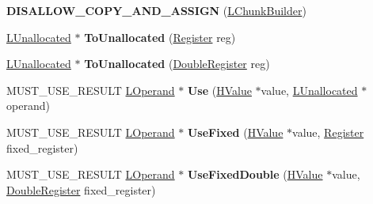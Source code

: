 \begin{DoxyCompactItemize}
\item 
{\bfseries D\+I\+S\+A\+L\+L\+O\+W\+\_\+\+C\+O\+P\+Y\+\_\+\+A\+N\+D\+\_\+\+A\+S\+S\+I\+GN} (\hyperlink{classv8_1_1internal_1_1_l_chunk_builder}{L\+Chunk\+Builder})\hypertarget{classv8_1_1internal_1_1_l_chunk_builder_a19b07322023329077a9f8c29451592b5}{}\label{classv8_1_1internal_1_1_l_chunk_builder_a19b07322023329077a9f8c29451592b5}

\item 
\hyperlink{classv8_1_1internal_1_1_l_unallocated}{L\+Unallocated} $\ast$ {\bfseries To\+Unallocated} (\hyperlink{structv8_1_1internal_1_1_register}{Register} reg)\hypertarget{classv8_1_1internal_1_1_l_chunk_builder_ae996944c8e59f0e19fe2743090135cb9}{}\label{classv8_1_1internal_1_1_l_chunk_builder_ae996944c8e59f0e19fe2743090135cb9}

\item 
\hyperlink{classv8_1_1internal_1_1_l_unallocated}{L\+Unallocated} $\ast$ {\bfseries To\+Unallocated} (\hyperlink{structv8_1_1internal_1_1_double_register}{Double\+Register} reg)\hypertarget{classv8_1_1internal_1_1_l_chunk_builder_a427a5c234ee24a3cf1c3036069908e31}{}\label{classv8_1_1internal_1_1_l_chunk_builder_a427a5c234ee24a3cf1c3036069908e31}

\item 
M\+U\+S\+T\+\_\+\+U\+S\+E\+\_\+\+R\+E\+S\+U\+LT \hyperlink{classv8_1_1internal_1_1_l_operand}{L\+Operand} $\ast$ {\bfseries Use} (\hyperlink{classv8_1_1internal_1_1_h_value}{H\+Value} $\ast$value, \hyperlink{classv8_1_1internal_1_1_l_unallocated}{L\+Unallocated} $\ast$operand)\hypertarget{classv8_1_1internal_1_1_l_chunk_builder_accd60b3b89817c5ad33a2124e268e793}{}\label{classv8_1_1internal_1_1_l_chunk_builder_accd60b3b89817c5ad33a2124e268e793}

\item 
M\+U\+S\+T\+\_\+\+U\+S\+E\+\_\+\+R\+E\+S\+U\+LT \hyperlink{classv8_1_1internal_1_1_l_operand}{L\+Operand} $\ast$ {\bfseries Use\+Fixed} (\hyperlink{classv8_1_1internal_1_1_h_value}{H\+Value} $\ast$value, \hyperlink{structv8_1_1internal_1_1_register}{Register} fixed\+\_\+register)\hypertarget{classv8_1_1internal_1_1_l_chunk_builder_a61be80f9ab32bd10c228aad8844f63b7}{}\label{classv8_1_1internal_1_1_l_chunk_builder_a61be80f9ab32bd10c228aad8844f63b7}

\item 
M\+U\+S\+T\+\_\+\+U\+S\+E\+\_\+\+R\+E\+S\+U\+LT \hyperlink{classv8_1_1internal_1_1_l_operand}{L\+Operand} $\ast$ {\bfseries Use\+Fixed\+Double} (\hyperlink{classv8_1_1internal_1_1_h_value}{H\+Value} $\ast$value, \hyperlink{structv8_1_1internal_1_1_double_register}{Double\+Register} fixed\+\_\+register)\hypertarget{classv8_1_1internal_1_1_l_chunk_builder_a30223bb99ad69217597b53afef85c6c1}{}\label{classv8_1_1internal_1_1_l_chunk_builder_a30223bb99ad69217597b53afef85c6c1}


\end{DoxyCompactItemize}
